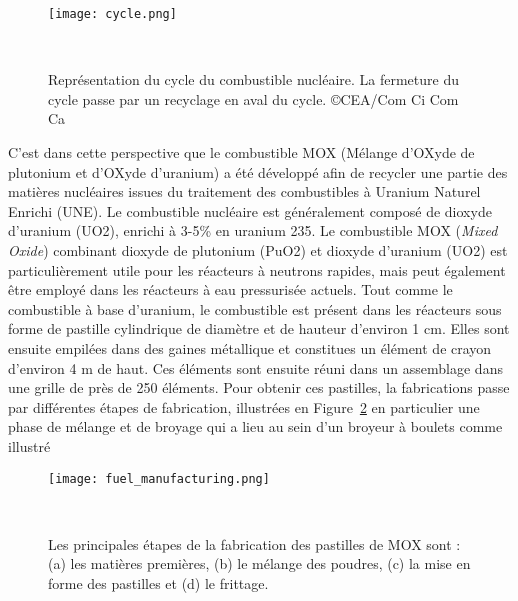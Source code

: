 \begin{figure}
    \centering
    \texttt{[image: cycle.png]}%
    \caption{Représentation du cycle du combustible nucléaire. La fermeture du cycle passe par un recyclage en aval du cycle. \copyright CEA/Com Ci Com Ca}~\label{fig:cycle_comb}
\end{figure}

C'est dans cette perspective que le combustible MOX (Mélange d’OXyde de plutonium et d’OXyde d’uranium) a été développé afin de recycler une partie des matières nucléaires issues du traitement des combustibles à Uranium Naturel Enrichi (UNE). Le combustible nucléaire est généralement composé de dioxyde d'uranium (UO2), enrichi à 3-5\% en uranium 235. Le combustible MOX (\textit{Mixed Oxide}) combinant dioxyde de plutonium (PuO2) et dioxyde d'uranium (UO2) est particulièrement utile pour les réacteurs à neutrons rapides, mais peut également être employé dans les réacteurs à eau pressurisée actuels.
Tout comme le combustible à base d'uranium, le combustible est présent dans les réacteurs sous forme de pastille cylindrique de diamètre et de hauteur d'environ 1 cm. Elles sont ensuite empilées dans des gaines métallique et constitues un élément de crayon d'environ 4 m de haut. Ces éléments sont ensuite réuni dans un assemblage dans une grille de près de 250 éléments. Pour obtenir ces pastilles, la fabrications passe par différentes étapes de fabrication, illustrées en Figure~\ref{fig:fab_comb} en particulier une phase de mélange et de broyage qui a lieu au sein d'un broyeur à boulets comme illustré

\begin{figure}[h]
    \centering
    \texttt{[image: fuel\_manufacturing.png]}
    \caption{Les principales étapes de la fabrication des pastilles de MOX sont : (a) les matières premières, (b) le mélange des poudres, (c) la mise en forme des pastilles et (d) le frittage.}~\label{fig:fab_comb}
\end{figure}

